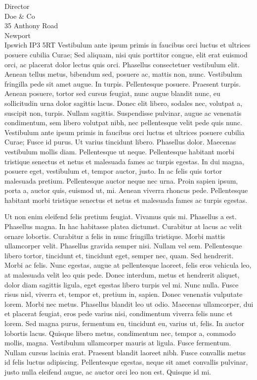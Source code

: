 \documentclass[a4paper]{scrlttr2}
\begin{document}
\begin{letter}{Director \\ Doe \& Co \\ 35 Anthony Road
\\ Newport \\ Ipswich IP3 5RT}
 Vestibulum ante ipsum primis in faucibus orci luctus et ultrices posuere cubilia Curae; Sed aliquam, nisi quis porttitor congue, elit erat euismod orci, ac placerat dolor lectus quis orci. Phasellus consectetuer vestibulum elit. Aenean tellus metus, bibendum sed, posuere ac, mattis non, nunc. Vestibulum fringilla pede sit amet augue. In turpis. Pellentesque posuere. Praesent turpis. Aenean posuere, tortor sed cursus feugiat, nunc augue blandit nunc, eu sollicitudin urna dolor sagittis lacus. Donec elit libero, sodales nec, volutpat a, suscipit non, turpis. Nullam sagittis. Suspendisse pulvinar, augue ac venenatis condimentum, sem libero volutpat nibh, nec pellentesque velit pede quis nunc. Vestibulum ante ipsum primis in faucibus orci luctus et ultrices posuere cubilia Curae; Fusce id purus. Ut varius tincidunt libero. Phasellus dolor. Maecenas vestibulum mollis diam. Pellentesque ut neque. Pellentesque habitant morbi tristique senectus et netus et malesuada fames ac turpis egestas. In dui magna, posuere eget, vestibulum et, tempor auctor, justo. In ac felis quis tortor malesuada pretium. Pellentesque auctor neque nec urna. Proin sapien ipsum, porta a, auctor quis, euismod ut, mi. Aenean viverra rhoncus pede. Pellentesque habitant morbi tristique senectus et netus et malesuada fames ac turpis egestas.
 
 Ut non enim eleifend felis pretium feugiat. Vivamus quis mi. Phasellus a est. Phasellus magna. In hac habitasse platea dictumst. Curabitur at lacus ac velit ornare lobortis. Curabitur a felis in nunc fringilla tristique. Morbi mattis ullamcorper velit. Phasellus gravida semper nisi. Nullam vel sem. Pellentesque libero tortor, tincidunt et, tincidunt eget, semper nec, quam. Sed hendrerit. Morbi ac felis. Nunc egestas, augue at pellentesque laoreet, felis eros vehicula leo, at malesuada velit leo quis pede. Donec interdum, metus et hendrerit aliquet, dolor diam sagittis ligula, eget egestas libero turpis vel mi. Nunc nulla. Fusce risus nisl, viverra et, tempor et, pretium in, sapien. Donec venenatis vulputate lorem. Morbi nec metus. Phasellus blandit leo ut odio. Maecenas ullamcorper, dui et placerat feugiat, eros pede varius nisi, condimentum viverra felis nunc et lorem. Sed magna purus, fermentum eu, tincidunt eu, varius ut, felis. In auctor lobortis lacus. Quisque libero metus, condimentum nec, tempor a, commodo mollis, magna. Vestibulum ullamcorper mauris at ligula. Fusce fermentum. Nullam cursus lacinia erat. Praesent blandit laoreet nibh. Fusce convallis metus id felis luctus adipiscing. Pellentesque egestas, neque sit amet convallis pulvinar, justo nulla eleifend augue, ac auctor orci leo non est. Quisque id mi.


\end{letter}
\end{document}
